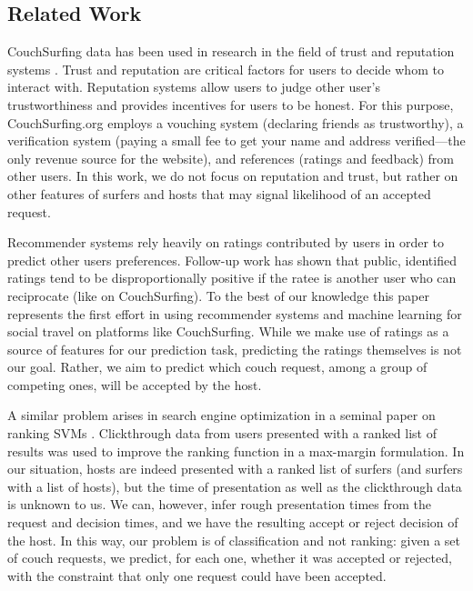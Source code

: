 \subsection{Related Work} \label{sec:related_work}
CouchSurfing data has been used in research in the field of trust and reputation systems \cite{Lauterbach2009}.
Trust and reputation are critical factors for users to decide whom to interact with.
Reputation systems allow users to judge other user's trustworthiness and provides incentives for users to be honest.
For this purpose, CouchSurfing.org employs a vouching system (declaring friends as trustworthy), a verification system (paying a small fee to get your name and address verified---the only revenue source for the website), and references (ratings and feedback) from other users.
In this work, we do not focus on reputation and trust, but rather on other features of surfers and hosts that may signal likelihood of an accepted request.

Recommender systems rely heavily on ratings contributed by users in order to predict other users preferences.
Follow-up work has shown that public, identified ratings tend to be disproportionally positive if the ratee is another user who can reciprocate \cite{Teng2010} (like on CouchSurfing). 
To the best of our knowledge this paper represents the first effort in using recommender systems and machine learning for social travel on platforms like CouchSurfing.
While we make use of ratings as a source of features for our prediction task, predicting the ratings themselves is not our goal.
Rather, we aim to predict which couch request, among a group of competing ones, will be accepted by the host.

A similar problem arises in search engine optimization in a seminal paper on ranking SVMs \cite{Joachims2002}.
Clickthrough data from users presented with a ranked list of results was used to improve the ranking function in a max-margin formulation.
In our situation, hosts are indeed presented with a ranked list of surfers (and surfers with a list of hosts), but the time of presentation as well as the clickthrough data is unknown to us.
We can, however, infer rough presentation times from the request and decision times, and we have the resulting accept or reject decision of the host.
In this way, our problem is of classification and not ranking: given a set of couch requests, we predict, for each one, whether it was accepted or rejected, with the constraint that only one request could have been accepted.

